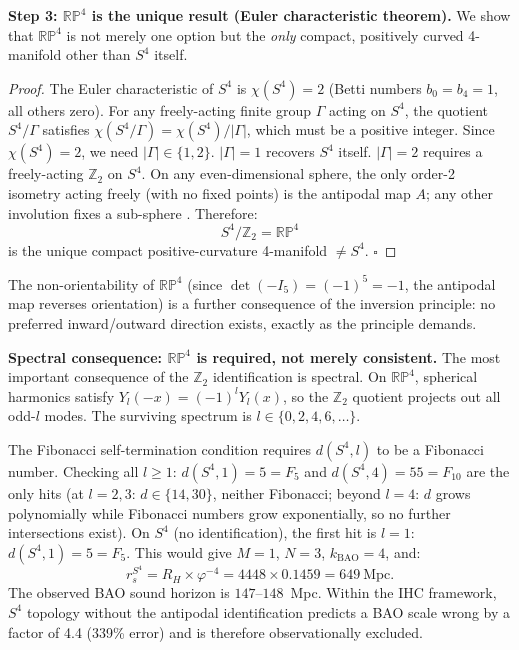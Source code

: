 \documentclass[12pt,a4paper]{article}
\begin{document}
\textbf{Step 3: $\mathbb{RP}^4$ is the unique result (Euler characteristic theorem).}
We show that $\mathbb{RP}^4$ is not merely one option but the \emph{only} compact,
positively curved 4-manifold other than $S^4$ itself.
\begin{proof}
The Euler characteristic of $S^4$ is $\chi(S^4) = 2$ (Betti numbers
$b_0 = b_4 = 1$, all others zero). For any freely-acting finite group $\Gamma$ acting
on $S^4$, the quotient $S^4/\Gamma$ satisfies $\chi(S^4/\Gamma) = \chi(S^4)/|\Gamma|$,
which must be a positive integer. Since $\chi(S^4) = 2$, we need $|\Gamma| \in \{1, 2\}$.
$|\Gamma| = 1$ recovers $S^4$ itself. $|\Gamma| = 2$ requires a freely-acting
$\mathbb{Z}_2$ on $S^4$. On any even-dimensional sphere, the only order-2
isometry acting freely (with no fixed points) is the antipodal map $A$; any other
involution fixes a sub-sphere \cite{Bredon1972}. Therefore:
\[
  S^4/\mathbb{Z}_2 = \mathbb{RP}^4
\]
is the unique compact positive-curvature 4-manifold $\neq S^4$. \hfill$\square$
\end{proof}

The non-orientability of $\mathbb{RP}^4$ (since $\det(-I_5) = (-1)^5 = -1$, the
antipodal map reverses orientation) is a further consequence of the inversion
principle: no preferred inward/outward direction exists, exactly as the principle
demands.

\textbf{Spectral consequence: $\mathbb{RP}^4$ is required, not merely consistent.}
The most important consequence of the $\mathbb{Z}_2$ identification is spectral.
On $\mathbb{RP}^4$, spherical harmonics satisfy
$Y_l(-x) = (-1)^l Y_l(x)$, so the $\mathbb{Z}_2$ quotient projects out all
odd-$l$ modes. The surviving spectrum is $l \in \{0, 2, 4, 6, \ldots\}$.

The Fibonacci self-termination condition requires $d(S^4, l)$ to be a
Fibonacci number. Checking all $l \geq 1$: $d(S^4,1) = 5 = F_5$ and
$d(S^4,4) = 55 = F_{10}$ are the only hits (at $l=2,3$: $d \in \{14,30\}$,
neither Fibonacci; beyond $l=4$: $d$ grows polynomially while Fibonacci
numbers grow exponentially, so no further intersections exist).
On $S^4$ (no identification), the first hit is $l = 1$: $d(S^4, 1) = 5 = F_5$. This would
give $M = 1$, $N = 3$, $k_\mathrm{BAO} = 4$, and:
\begin{equation}
  r_s^{S^4} = R_H \times \varphi^{-4} = 4448 \times 0.1459 = 649~\mathrm{Mpc}.
  \label{eq:s4_prediction}
\end{equation}
The observed BAO sound horizon is $147$--$148$~Mpc. Within the IHC framework,
$S^4$ topology without the antipodal identification predicts a BAO scale
wrong by a factor of 4.4 (339\% error) and is therefore observationally excluded.
\end{document}
